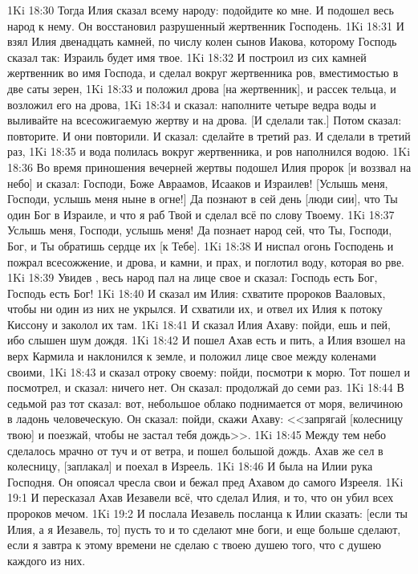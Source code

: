 \vs 1Ki 18:30 Тогда Илия сказал всему народу: подойдите ко мне. И подошел весь народ к нему. Он восстановил разрушенный жертвенник Господень.
\vs 1Ki 18:31 И взял Илия двенадцать камней, по числу колен сынов Иакова, которому Господь сказал так: Израиль будет имя твое.
\vs 1Ki 18:32 И построил из сих камней жертвенник во имя Господа, и сделал вокруг жертвенника ров, вместимостью в две саты зерен,
\vs 1Ki 18:33 и положил дрова [на жертвенник], и рассек тельца, и возложил его на дрова,
\vs 1Ki 18:34 и сказал: наполните четыре ведра воды и выливайте на всесожигаемую жертву и на дрова. [И сделали так.] Потом сказал: повторите. И они повторили. И сказал: сделайте  в третий раз. И сделали в третий раз,
\vs 1Ki 18:35 и вода полилась вокруг жертвенника, и ров наполнился водою.
\vs 1Ki 18:36 Во время приношения вечерней жертвы подошел Илия пророк [и воззвал на небо] и сказал: Господи, Боже Авраамов, Исааков и Израилев! [Услышь меня, Господи, услышь меня ныне в огне!] Да познают в сей день [люди сии], что Ты один Бог в Израиле, и что я раб Твой и сделал всё по слову Твоему.
\vs 1Ki 18:37 Услышь меня, Господи, услышь меня! Да познает народ сей, что Ты, Господи, Бог, и Ты обратишь сердце их [к Тебе].
\vs 1Ki 18:38 И ниспал огонь Господень и пожрал всесожжение, и дрова, и камни, и прах, и поглотил воду, которая во рве.
\vs 1Ki 18:39 Увидев , весь народ пал на лице свое и сказал: Господь есть Бог, Господь есть Бог!
\vs 1Ki 18:40 И сказал им Илия: схватите пророков Вааловых, чтобы ни один из них не укрылся. И схватили их, и отвел их Илия к потоку Киссону и заколол их там.
\vs 1Ki 18:41 И сказал Илия Ахаву: пойди, ешь и пей, ибо слышен шум дождя.
\vs 1Ki 18:42 И пошел Ахав есть и пить, а Илия взошел на верх Кармила и наклонился к земле, и положил лице свое между коленами своими,
\vs 1Ki 18:43 и сказал отроку своему: пойди, посмотри к морю. Тот пошел и посмотрел, и сказал: ничего нет. Он сказал: продолжай  до семи раз.
\vs 1Ki 18:44 В седьмой раз тот сказал: вот, небольшое облако поднимается от моря, величиною в ладонь человеческую. Он сказал: пойди, скажи Ахаву: <<запрягай [колесницу твою] и поезжай, чтобы не застал тебя дождь>>.
\vs 1Ki 18:45 Между тем небо сделалось мрачно от туч и от ветра, и пошел большой дождь. Ахав же сел в колесницу, [заплакал] и поехал в Изреель.
\vs 1Ki 18:46 И была на Илии рука Господня. Он опоясал чресла свои и бежал пред Ахавом до самого Изрееля.
\vs 1Ki 19:1 И пересказал Ахав Иезавели всё, что сделал Илия, и то, что он убил всех пророков мечом.
\vs 1Ki 19:2 И послала Иезавель посланца к Илии сказать: [если ты Илия, а я Иезавель, то] пусть то и то сделают мне боги, и еще больше сделают, если я завтра к этому времени не сделаю с твоею душею того, что  с душею каждого из них.

